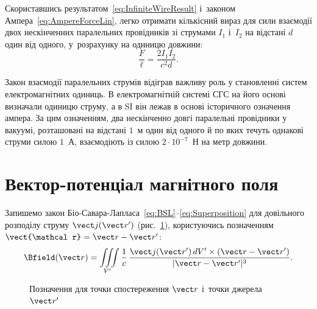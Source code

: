 Скориставшись результатом~\eqref{eq:InfiniteWireResult} і~законом
Ампера~\eqref{eq:AmpereForceLin}, легко отримати кількісний вираз для сили взаємодії двох
нескінченних паралельних провідників зі струмами $I_1$ і~$I_2$ на відстані $d$ один від
одного, у~розрахунку на одиницю довжини:
\begin{equation}\label{eq:AmpereParallelWires}
	\frac{F}{\ell} = \frac{2I_1I_2}{c^2 d}.
\end{equation}

\begin{Historical}
	Закон взаємодії паралельних струмів відіграв важливу роль у становленні систем електромагнітних одиниць. В електромагнітній системі СГС на його основі визначали одиницю струму, а в SI він лежав в основі історичного означення ампера. За цим означенням, два нескінченно довгі паралельні провідники у вакуумі, розташовані на відстані $1$~м один від одного й по яких течуть однакові струми силою $1$~А, взаємодіють із силою $2\cdot10^{-7}$~Н на метр довжини.
\end{Historical}



\section{Вектор-потенціал магнітного поля}\hypertarget{magnetic-vector-potential}{}


Запишемо закон Біо-Савара-Лапласа~\eqref{eq:BSL}--\eqref{eq:Superposition} для довільного
розподілу струму $\vect j(\vect r')$ (рис.~\ref{pic:FieldPoint}), користуючись позначенням
$\vect{\mathcal r} = \vect r - \vect r'$:
\begin{equation*}
	\Bfield(\vect r) = \iiint\limits_{V'} \frac1c\, \frac{\vect j(\vect r')\, dV' \times(\vect r-\vect r')}{|\vect r - \vect r'|^3}.
\end{equation*}

\begin{figure}\centering
	\caption{Позначення для точки спостереження $\vect r$ і~точки джерела $\vect
			r'$\label{pic:FieldPoint}}
\end{figure}

